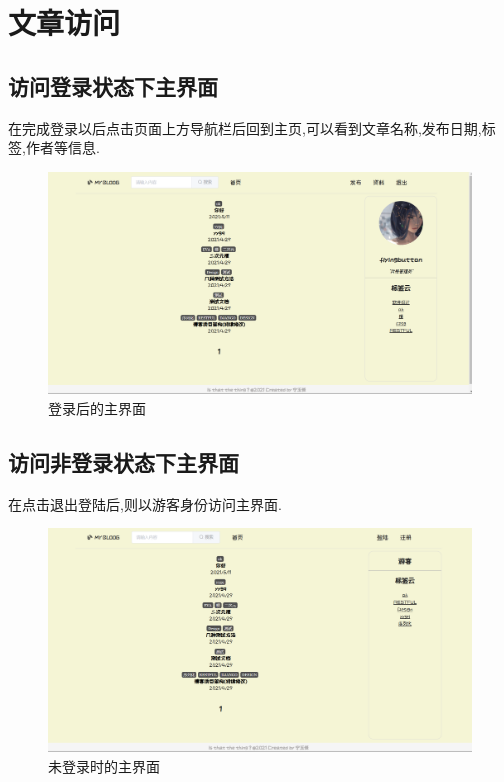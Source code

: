 \section{文章访问}

\subsection{访问登录状态下主界面}
在完成登录以后点击页面上方导航栏后回到主页,可以看到文章名称,发布日期,标签,作者等信息.

\begin{figure}[thbp!]
	\centering
	\includegraphics[scale=0.35]{figure/home_page_login}
	\caption{登录后的主界面}
\end{figure}

\subsection{访问非登录状态下主界面}
在点击退出登陆后,则以游客身份访问主界面.

\begin{figure}[thbp!]
	\centering
	\includegraphics[scale=0.35]{figure/home_page_guest}
	\caption{未登录时的主界面}
\end{figure}

